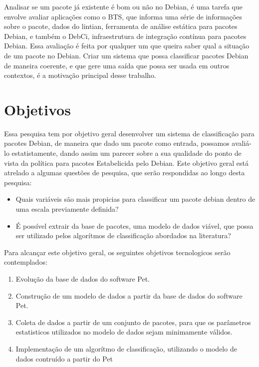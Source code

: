         Analisar se um pacote já existente é bom ou não no Debian, é uma tarefa que envolve avaliar aplicações como o BTS, que informa uma série de informações sobre o pacote, dados do lintian, ferramenta de análise estática para pacotes Debian, e também o DebCi, infraestrutura de integração contínua para pacotes Debian. Essa avaliação é feita por qualquer um que queira saber qual a situação de um pacote no Debian. Criar um sistema que possa classificar pacotes Debian de maneira coerente, e que gere uma saída que possa ser usada em outros contextos, é a motivação principal desse trabalho.

\section{Objetivos}

        Essa pesquisa tem por objetivo geral desenvolver um sistema de classificação para pacotes Debian, de maneira que dado um pacote
        como entrada, possamos avaliá-lo estatistamente, dando assim um parecer sobre a sua qualidade do ponto de vista da política para pacotes Estabelicida pelo Debian.
        Este objetivo geral está atrelado a algumas questões de pesquisa, que serão respondidas ao longo desta pesquisa:
        \begin{itemize}
                \item Quais variáveis são mais propicias para classificar um pacote debian dentro de uma escala previamente definida?
                \item É possível extrair da base de pacotes, uma modelo de dados viável, que possa ser utilizado pelos algorítmos de classificação abordados na literatura?
        \end{itemize}

        Para alcançar este objetivo geral, os seguintes objetivos tecnologicos serão contemplados:
                \begin{enumerate}
                        \item Evolução da base de dados do software Pet.
                        \item Construção de um modelo de dados a partir da base de dados do software Pet.
                        \item Coleta de dados a partir de um conjunto de pacotes, para que os parâmetros estatisticos utilizados no modelo de dados sejam minimamente válidos.
                        \item Implementação de um algorítmo de classificação, utilizando o modelo de dados contruído a partir do Pet
                \end{enumerate}

